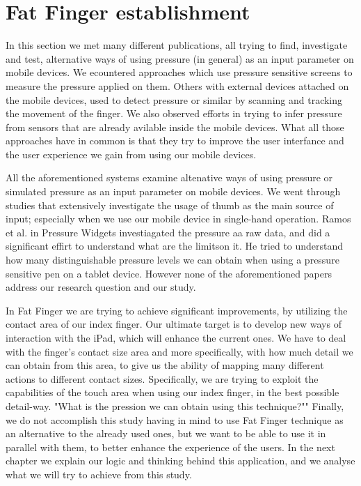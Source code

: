 \section{Fat Finger establishment}

In this section we met many different publications, all trying to find, investigate and test, alternative ways of using pressure (in general) as an input parameter on mobile devices. We ecountered approaches which use pressure sensitive screens to measure the pressure applied on them. Others with external devices attached on the mobile devices, used to detect pressure or similar by scanning and tracking the movement of the finger. We also observed efforts in trying to infer pressure from sensors that are already avilable inside the mobile devices. What all those approaches have in common is that they try to improve the user interfance and the user experience we gain from using our mobile devices.

All the aforementioned systems examine altenative ways of using pressure or simulated pressure as an input parameter on mobile devices. We went through studies that extensively investigate the usage of thumb as the main source of input; especially when we use our mobile device in single-hand operation. Ramos et al. in Pressure Widgets \cite{Ramos2004} investiagated the pressure aa raw data, and did a significant effirt to understand what are the limitson it. He tried to understand how many distinguishable pressure levels we can obtain when using a pressure sensitive pen on a tablet device. However none of the aforementioned papers address our research question and our study.

In Fat Finger we are trying to achieve significant improvements, by utilizing the contact area of our index finger. Our ultimate target is to develop new ways of interaction with the iPad, which will enhance the current ones. We have to deal with the finger’s contact size area and more specifically, with how much detail we can obtain from this area, to give us the ability of mapping many different actions to different contact sizes. Specifically, we are trying to exploit the capabilities of the touch area when using our index finger, in the best possible detail-way. "What is the pression we can obtain using this technique?"" Finally, we do not accomplish this study having in mind to use Fat Finger technique as an alternative to the already used ones, but we want to be able to use it in parallel with them, to better enhance the experience of the users. In the next chapter we explain our logic and thinking behind this application, and we analyse what we will try to achieve from this study.